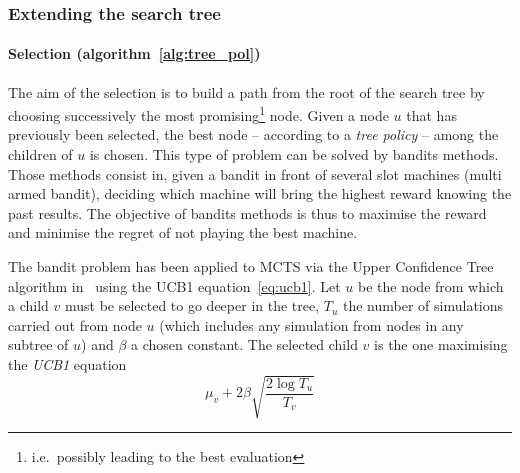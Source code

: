 \documentclass[oneside,twocolumn]{article}
\begin{document}
\subsubsection{Extending the search tree}
\paragraph{Selection (algorithm~\ref{alg:tree_pol})}
The aim of the selection is to build a path from the root of the search tree
by choosing successively the most
promising\footnote{i.e.\ possibly leading to the best evaluation} node.
Given a node \(u\) that has previously been selected, the
best node --
according to a \emph{tree policy} -- among the children of \(u\) is
chosen.
This type
of problem can be solved by bandits methods.
Those methods consist in, given a bandit in front of several slot machines
(multi armed bandit), deciding which machine will bring the highest reward
knowing
the past results. The objective of bandits methods is thus to maximise the reward
and minimise the regret of not playing the best machine.

The bandit problem has been applied to MCTS via the Upper Confidence Tree
algorithm in~\cite{kocsis2006bandit} using the UCB1 equation~\ref{eq:ucb1}.
Let \(u\) be the node from which a child \(v\) must be selected to go deeper in
the tree, \(T_u\) the number of simulations carried out from node \(u\)
(which includes any simulation from nodes in any subtree of \(u\)) and
\(\beta\) a chosen constant. The selected child \(v\) is the one maximising the
\emph{UCB1} equation
\begin{equation}
  \label{eq:ucb1}
  \mu_v + 2 \beta \sqrt{\frac{2 \log T_u}{T_v}}
\end{equation}
\end{document}

